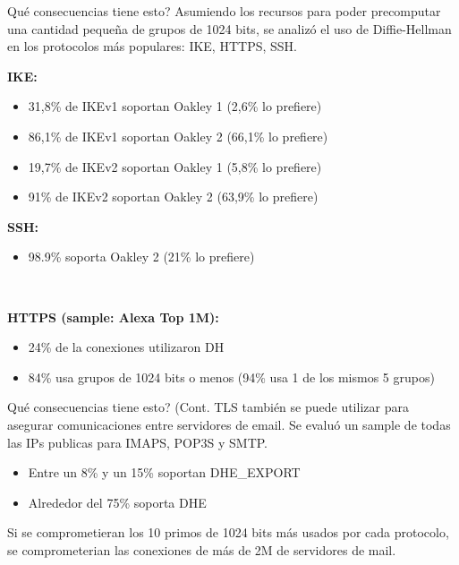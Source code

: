 \documentclass{beamer}
\begin{document}
\begin{frame}{Qué consecuencias tiene esto?}
    Asumiendo los recursos para poder precomputar una cantidad pequeña de grupos de 1024 bits, se analizó el uso de Diffie-Hellman en los protocolos más populares: IKE, HTTPS, SSH.

    \textbf{IKE:}
    \begin{itemize}
        \item 31,8\% de IKEv1 soportan Oakley 1 (2,6\% lo prefiere)
        \item 86,1\% de IKEv1 soportan Oakley 2 (66,1\% lo prefiere)
        \item 19,7\% de IKEv2 soportan Oakley 1 (5,8\% lo prefiere)
        \item 91\% de IKEv2 soportan Oakley 2 (63,9\% lo prefiere)
    \end{itemize}

    \textbf{SSH:}
    \begin{itemize}
        \item 98.9\% soporta Oakley 2 (21\% lo prefiere)
    \end{itemize}\

    \textbf{HTTPS (sample: Alexa Top 1M):}
    \begin{itemize}
        \item 24\% de la conexiones utilizaron DH
        \item 84\% usa grupos de 1024 bits o menos (94\% usa 1 de los mismos 5 grupos)
    \end{itemize}
\end{frame}

\begin{frame}{Qué consecuencias tiene esto? (Cont.}
    TLS también se puede utilizar para asegurar comunicaciones entre servidores de email. Se evaluó un sample de todas las IPs publicas para IMAPS, POP3S y SMTP. %
    
    \begin{itemize}
        \item Entre un 8\% y un 15\% soportan DHE\_EXPORT
        \item Alrededor del 75\% soporta DHE
    \end{itemize}
    
    Si se comprometieran los 10 primos de 1024 bits más usados por cada protocolo, se comprometerian las conexiones de más de 2M de servidores de mail.
\end{frame}
\end{document}
